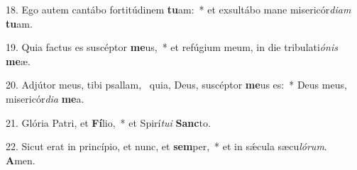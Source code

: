 18. Ego autem cantábo fortitúdinem \textbf{tu}am:~*  et exsultábo mane misericór\textit{di}\textit{am} \textbf{tu}am.\

19. Quia factus es suscéptor \textbf{me}us,~*  et refúgium meum, in die tribulati\textit{ó}\textit{nis} \textbf{me}æ.\

20. Adjútor meus, tibi psallam, \dag\  quia, Deus, suscéptor \textbf{me}us es:~*  Deus meus, misericór\textit{di}\textit{a} \textbf{me}a.\

21. Glória Patri, et \textbf{Fí}lio,~*  et Spirí\textit{tu}\textit{i} \textbf{Sanc}to.\

22. Sicut erat in princípio, et nunc, et \textbf{sem}per,~*  et in sǽcula sæcu\textit{ló}\textit{rum}. \textbf{A}men.\

